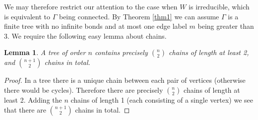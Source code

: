 \documentclass[a4paper,12pt]{article}
\newtheorem{lemma}[thm]{Lemma}
\theoremstyle{definition}
\begin{document}
We may therefore restrict our attention to the case when $W$ is irreducible, which is equivalent to $\Gamma$ being connected. By Theorem \ref{thm1} we can assume $\Gamma$ is a finite tree with no infinite bonds and at most one edge label $m$ being greater than 3. We require the following easy lemma about chains.

\begin{lemma}
\label{chain} A tree of order $n$ contains precisely $\binom{n}{2}$ chains of length at least 2, and $\binom{n+1}{2}$ chains in total.
\end{lemma}
\begin{proof}
In a tree there is a unique chain between each pair of vertices (otherwise there would be cycles). Therefore there are precisely $\binom{n}{2}$ chains of length at least 2. Adding the $n$ chains of length 1 (each consisting of a single vertex) we see that there are $\binom{n+1}{2}$ chains in total.
\end{proof}
\end{document}
